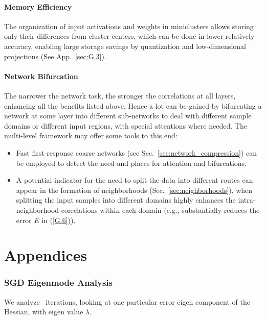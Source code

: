 \documentclass{article} %
\begin{document}
\subsection{Memory Efficiency}
\label{sec:memory_efficiency}
The organization of input activations and weights in miniclusters allows storing only their differences from cluster centers, which can be done in lower relatively accuracy, enabling large storage savings by quantization and low-dimensional projections (See App.~\ref{sec:G.3}).

\subsection{Network Bifurcation}
\label{sec:bifurcation}
The narrower the network task, the stronger the correlations at all layers, enhancing all the benefits listed above. Hence a lot can be gained by bifurcating a network at some layer into different sub-networks to deal with different sample domains or different input regions, with special attentions where needed. The multi-level framework may offer some tools to this end:
\begin{itemize}
	\item Fast first-response coarse networks (see Sec.~\ref{sec:network_compression}) can be employed to detect the need and places for attention and bifurcations.
	\item A potential indicator for the need to split the data into different routes can appear in the formation of neighborhoods (Sec.~\ref{sec:neighborhoods}), when splitting the input samples into different domains highly enhances the intra-neighborhood correlations within each domain (e.g., substantially reduces the error $E$ in (\ref{G.6})).
\end{itemize}


\newpage
\part{Appendices}

\appendix

\section{SGD Eigenmode Analysis}
\label{sec:sgd_eigenmode}
We analyze \SGD~iterations, looking at one particular error eigen component of the Hessian, with eigen value $\lambda$.
\end{document}
